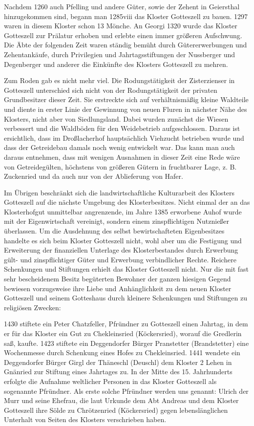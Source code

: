 \documentclass[12pt,a4pager]{book}
\begin{document}
Nachdem 1260 auch Pfelling und andere Güter, sowie der Zehent in Geiersthal
hinzugekommen sind, begann man 1285viii das Kloster Gotteszell zu bauen. 1297
waren in diesem Kloster schon 13 Mönche. An Georgi 1320 wurde das Kloster
Gotteszell zur Prälatur erhoben und erlebte einen immer größeren Aufschwung. Die
Äbte der folgenden Zeit waren ständig bemüht durch Gütererwerbungen und
Zehentankäufe, durch Privilegien und Jahrtagsstiftungen der Nussberger und
Degenberger und anderer die Einkünfte des Klosters Gotteszell zu mehren.

Zum Roden gab es nicht mehr viel. Die Rodungstätigkeit der Zisterzienser in
Gotteszell unterschied sich nicht von der Rodungstätigkeit der privaten
Grundbesitzer dieser Zeit. Sie erstreckte sich auf verhältnismäßig kleine
Waldteile und diente in erster Linie der Gewinnung von neuen Fluren in nächster
Nähe des Klosters, nicht aber von Siedlungsland. Dabei wurden zunächst die
Wiesen verbessert und die Waldböden für den Weidebetrieb aufgeschlossen. Daraus
ist ersichtlich, dass im Droßlacherhof hauptsächlich Viehzucht betrieben wurde
und dass der Getreidebau damals noch wenig entwickelt war. Das kann man auch
daraus entnehmen, dass mit wenigen Ausnahmen in dieser Zeit eine Rede wäre von
Getreidegülten, höchstens von größeren Gütern in fruchtbarer Lage, z. B.
Zuckenried und da auch nur von der Ablieferung von Hafer.

Im Übrigen beschränkt sich die landwirtschaftliche Kulturarbeit des Klosters
Gotteszell auf die nächste Umgebung des Klosterbesitzes. Nicht einmal der an das
Klosterhofgut unmittelbar angrenzende, im Jahre 1385 erworbene Auhof wurde mit
der Eigenwirtschaft vereinigt, sondern einem zinspflichtigen Nutznießer
überlassen. Um die Ausdehnung des selbst bewirtschafteten Eigenbesitzes handelte
es sich beim Kloster Gotteszell nicht, wohl aber um die Festigung und
Erweiterung der finanziellen Unterlage des Klosterbestandes durch Erwerbung
gült- und zinspflichtiger Güter und Erwerbung verbindlicher Rechte. Reichere
Schenkungen und Stiftungen erhielt das Kloster Gotteszell nicht. Nur die mit
fast sehr bescheidenem Besitz begüterten Bewohner der ganzen hiesigen Gegend
bewiesen vorzugsweise ihre Liebe und Anhänglichkeit zu dem neuen Kloster
Gotteszell und seinem Gotteshaus durch kleinere Schenkungen und Stiftungen zu
religiösen Zwecken:

1430 stiftete ein Peter Chatzfeller, Pfründner zu Gotteszell einen Jahrtag, in
dem er für das Kloster ein Gut zu Chekleinsried (Köckersried), worauf die
Gredlerin saß, kaufte. 1423 stiftete ein Deggendorfer Bürger Pranstetter
(Brandstetter) eine Wochenmesse durch Schenkung eines Hofes zu Chekleinsried.
1441 wendete ein Deggendorfer Bürger Girgl der Thäneschl (Deuschl) dem Kloster 2
Lehen in Gnänried zur Stiftung eines Jahrtages zu. In der Mitte des 15.
Jahrhunderts erfolgte die Aufnahme weltlicher Personen in das Kloster Gotteszell
als sogenannte Pfründner. Als erste solche Pfründner werden uns genannt: Ulrich
der Murr und seine Ehefrau, die laut Urkunde dem Abt Andreas und dem Kloster
Gotteszell ihre Sölde zu Chrötzenried (Köckersried) gegen lebenslänglichen
Unterhalt von Seiten des Klosters verschrieben haben.
\end{document}
